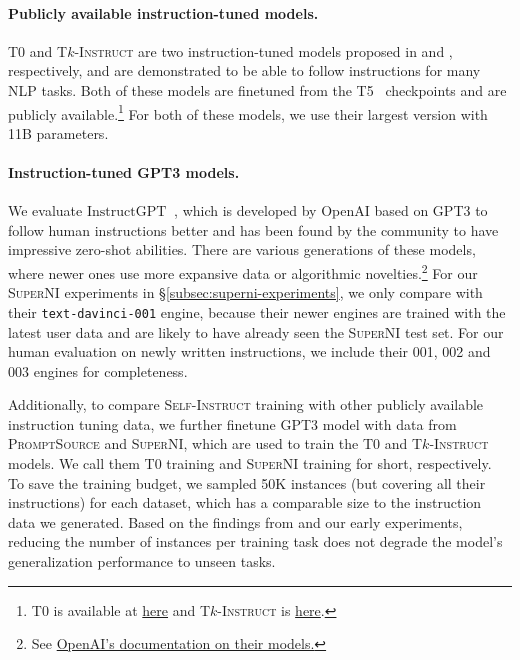 \documentclass[11pt]{article}
\newcommand{\name}{\textsc{Self-Instruct}}
\newcommand{\supernatShort}{\textsc{SuperNI}}
\newcommand{\tkinstruct}{\textsc{T$k$-Instruct}}
\newcommand{\tzero}{\textsc{T$0$}}
\newcommand{\gptinstruct}[1]{$\text{InstructGPT}_{\text{#1}}$}
\newcommand{\promptsource}{\textsc{PromptSource}}
\begin{document}
\paragraph{Publicly available instruction-tuned models.}
\tzero{} and \tkinstruct{} are two instruction-tuned models proposed in \citet{sanh2022multitask} and \citet{wang2022benchmarking}, respectively, and are demonstrated to be able to follow instructions for many NLP tasks. 
Both of these models are finetuned from the T5~\cite{raffel2020exploring} checkpoints and are publicly available.\footnote{
\tzero{} is available at \href{https://huggingface.co/bigscience/T0}{here} and \tkinstruct{} is  \href{https://huggingface.co/allenai/tk-instruct-11b-def}{here}.
} For both of these models, we use their largest version with 11B parameters.



\paragraph{Instruction-tuned GPT3 models.}
 We evaluate \gptinstruct{}~\cite{ouyang2022training}, 
which is developed by OpenAI based on GPT3 to follow human instructions better and has been found by the community to have impressive zero-shot abilities. 
There are various generations of these models,
where newer ones use more expansive data or algorithmic novelties.\footnote{
See \href{https://beta.openai.com/docs/model-index-for-researchers}{OpenAI's documentation on their models.}
} 
For our \supernatShort{} experiments in \S\ref{subsec:superni-experiments}, we only compare with their \texttt{text-davinci-001} engine, because their newer engines are trained with the latest user data and are likely to have already seen the \supernatShort{} test set. For our human evaluation on newly written instructions, we include their 001, 002 and 003 engines for completeness.

Additionally, to compare \name{} training with other publicly available instruction tuning data, we further finetune GPT3 model with data from \promptsource{} and \supernatShort{}, which are used to train the \tzero{} and \tkinstruct{} models. We call them \tzero{} training and \supernatShort{} training for short, respectively. 
To save the training budget, we sampled 50K instances (but covering all their instructions) for each dataset, which has a comparable size to the instruction data we generated. Based on the findings from \citet{wang2022benchmarking} and our early experiments, reducing the number of instances per training task does not degrade the model's generalization performance to unseen tasks.
\end{document}
